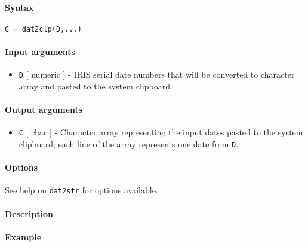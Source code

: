 


	\paragraph{Syntax}\label{syntax}

\begin{verbatim}
C = dat2clp(D,...)
\end{verbatim}

\paragraph{Input arguments}\label{input-arguments}

\begin{itemize}
\itemsep1pt\parskip0pt
\item
  \texttt{D} {[} numeric {]} - IRIS serial date numbers that will be
  converted to character array and pasted to the system clipboard.
\end{itemize}

\paragraph{Output arguments}\label{output-arguments}

\begin{itemize}
\itemsep1pt\parskip0pt
\item
  \texttt{C} {[} char {]} - Character array representing the input dates
  pasted to the system clipboard; each line of the array represents one
  date from \texttt{D}.
\end{itemize}

\paragraph{Options}\label{options}

See help on \href{dates/dat2str}{\texttt{dat2str}} for options
available.

\paragraph{Description}\label{description}

\paragraph{Example}\label{example}



